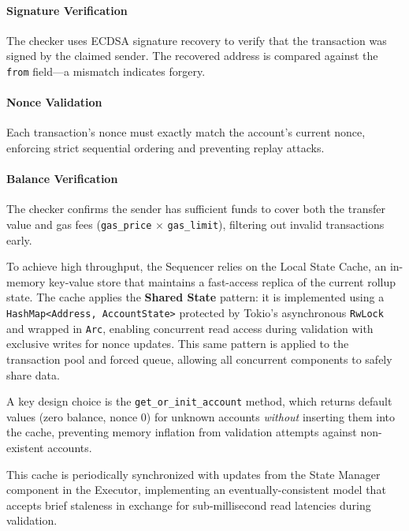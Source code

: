 \paragraph{Signature Verification}
The checker uses ECDSA signature recovery to verify that the transaction was signed by the claimed sender. The recovered address is compared against the \texttt{from} field---a mismatch indicates forgery.

\paragraph{Nonce Validation}
Each transaction's nonce must exactly match the account's current nonce, enforcing strict sequential ordering and preventing replay attacks.

\paragraph{Balance Verification}
The checker confirms the sender has sufficient funds to cover both the transfer value and gas fees (\texttt{gas\_price} $\times$ \texttt{gas\_limit}), filtering out invalid transactions early.


To achieve high throughput, the Sequencer relies on the Local State Cache, an in-memory key-value store that maintains a fast-access replica of the current rollup state. The cache applies the \textbf{Shared State} pattern: it is implemented using a \texttt{HashMap<Address, AccountState>} protected by Tokio's asynchronous \texttt{RwLock} and wrapped in \texttt{Arc}, enabling concurrent read access during validation with exclusive writes for nonce updates. This same pattern is applied to the transaction pool and forced queue, allowing all concurrent components to safely share data.

A key design choice is the \texttt{get\_or\_init\_account} method, which returns default values (zero balance, nonce 0) for unknown accounts \emph{without} inserting them into the cache, preventing memory inflation from validation attempts against non-existent accounts.

This cache is periodically synchronized with updates from the State Manager component in the Executor, implementing an eventually-consistent model that accepts brief staleness in exchange for sub-millisecond read latencies during validation.


